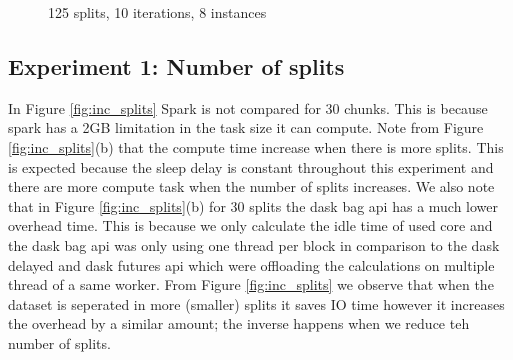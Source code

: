\documentclass[11pt,a4paper]{article}
\begin{document}
\begin{figure}[htp]
    \centering
    
    \caption{125 splits, 10 iterations, 8 instances}
    \label{fig:inc_sleep}
\end{figure}


\subsection{Experiment 1: Number of splits}
In Figure \ref{fig:inc_splits} Spark is not compared for 30 chunks. This is because
spark has a 2GB limitation in the task size it can compute. Note from Figure
\ref{fig:inc_splits}(b) that the compute time increase when there is more splits.
This is expected because the sleep delay is constant throughout this experiment and
there are more compute task when the number of splits increases. We also note that in
Figure \ref{fig:inc_splits}(b) for 30 splits the dask bag api has a much lower
overhead time. This is because we only calculate the idle time of used core and the
dask bag api was only using one thread per block in comparison to the dask delayed
and dask futures api which were offloading the calculations on multiple thread of a
same worker. From Figure \ref{fig:inc_splits} we observe that when the dataset is
seperated in more (smaller) splits it saves IO time however it increases the overhead
by a similar amount; the inverse happens when we reduce teh number of splits.
\end{document}
